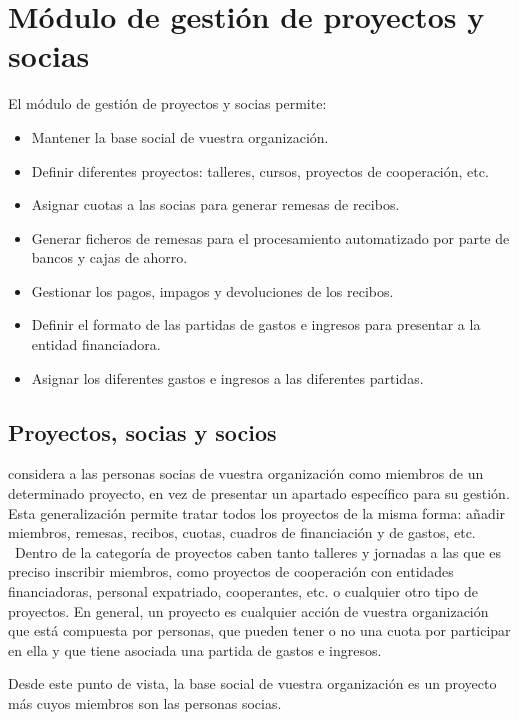 \chapter{Módulo de gestión de proyectos y socias}

\bigskip

El módulo de gestión de proyectos y socias permite:

\liststyleLix
\begin{itemize}
\item Mantener la base social de vuestra organización.
\item Definir diferentes proyectos: talleres, cursos, proyectos de
cooperación, etc.
\item Asignar cuotas a las socias para generar remesas de recibos.
\item Generar ficheros de remesas para el procesamiento automatizado por
parte de bancos y cajas de ahorro.
\item Gestionar los pagos, impagos y devoluciones de los recibos.
\item Definir el formato de las partidas de gastos e ingresos para
presentar a la entidad financiadora.
\item Asignar los diferentes gastos e ingresos a las diferentes
partidas.


\bigskip
\end{itemize}
\section{Proyectos, socias y socios}
\appname considera a las personas socias de vuestra organización como
miembros de un determinado proyecto, en vez de presentar un apartado
específico para su gestión. Esta generalización permite tratar
todos los proyectos de la misma forma: añadir miembros, remesas,
recibos, cuotas, cuadros de financiación y de gastos, etc. \ Dentro
de la categoría de proyectos caben tanto talleres y jornadas a las
que es preciso inscribir miembros, como proyectos de cooperación con
entidades financiadoras, personal expatriado, cooperantes, etc. o
cualquier otro tipo de proyectos. En general, un proyecto es cualquier
acción de vuestra organización que está compuesta por personas,
que pueden tener o no una cuota por participar en ella y que tiene
asociada una partida de gastos e ingresos.

Desde este punto de vista, la base social de vuestra organización es
un proyecto más cuyos miembros son las personas socias.


\bigskip

